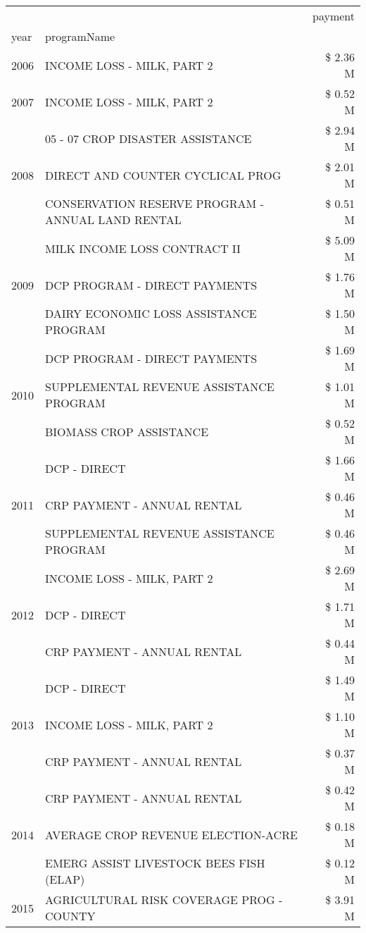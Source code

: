 \begin{tabular}{llr}
\toprule
 &  & payment \\
year & programName &  \\
\midrule
2006 & INCOME LOSS - MILK, PART 2 & \$ 2.36 M \\
\cline{1-3}
2007 & INCOME LOSS - MILK, PART 2 & \$ 0.52 M \\
\cline{1-3}
\multirow[t]{3}{*}{2008} & 05 - 07 CROP DISASTER ASSISTANCE & \$ 2.94 M \\
 & DIRECT AND COUNTER CYCLICAL PROG & \$ 2.01 M \\
 & CONSERVATION RESERVE PROGRAM - ANNUAL LAND RENTAL & \$ 0.51 M \\
\cline{1-3}
\multirow[t]{3}{*}{2009} & MILK INCOME LOSS CONTRACT II & \$ 5.09 M \\
 & DCP PROGRAM - DIRECT PAYMENTS & \$ 1.76 M \\
 & DAIRY ECONOMIC LOSS ASSISTANCE PROGRAM & \$ 1.50 M \\
\cline{1-3}
\multirow[t]{3}{*}{2010} & DCP PROGRAM - DIRECT PAYMENTS & \$ 1.69 M \\
 & SUPPLEMENTAL REVENUE ASSISTANCE PROGRAM & \$ 1.01 M \\
 & BIOMASS CROP ASSISTANCE & \$ 0.52 M \\
\cline{1-3}
\multirow[t]{3}{*}{2011} & DCP - DIRECT & \$ 1.66 M \\
 & CRP PAYMENT - ANNUAL RENTAL & \$ 0.46 M \\
 & SUPPLEMENTAL REVENUE ASSISTANCE PROGRAM & \$ 0.46 M \\
\cline{1-3}
\multirow[t]{3}{*}{2012} & INCOME LOSS - MILK, PART 2 & \$ 2.69 M \\
 & DCP - DIRECT & \$ 1.71 M \\
 & CRP PAYMENT - ANNUAL RENTAL & \$ 0.44 M \\
\cline{1-3}
\multirow[t]{3}{*}{2013} & DCP - DIRECT & \$ 1.49 M \\
 & INCOME LOSS - MILK, PART 2 & \$ 1.10 M \\
 & CRP PAYMENT - ANNUAL RENTAL & \$ 0.37 M \\
\cline{1-3}
\multirow[t]{3}{*}{2014} & CRP PAYMENT - ANNUAL RENTAL & \$ 0.42 M \\
 & AVERAGE CROP REVENUE ELECTION-ACRE & \$ 0.18 M \\
 & EMERG ASSIST LIVESTOCK BEES FISH (ELAP) & \$ 0.12 M \\
\cline{1-3}
\multirow[t]{3}{*}{2015} & AGRICULTURAL RISK COVERAGE PROG - COUNTY & \$ 3.91 M \\

\end{tabular}
